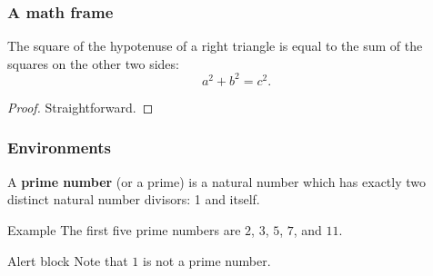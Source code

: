 \documentclass[pdflatex,compress,aspectratio=169]{beamer}
\begin{document}
\begin{frame}
\frametitle{A math frame}

\begin{theorem}[Pythagoras]
The square of the hypotenuse of a \alert{right} triangle is equal to the sum of the squares on the other two sides:
\[
a^2 + b^2 = c^2.
\]
\end{theorem}

\begin{proof}
Straightforward.
\end{proof}

\end{frame}


\begin{frame}
\frametitle{Environments}

\begin{definition}
A \textbf{prime number} (or a prime) is a natural number which has exactly two distinct natural number divisors: 1 and itself.
\end{definition}

\begin{exampleblock}{Example}
The first five prime numbers are $2$, $3$, $5$, $7$, and $11$.
\end{exampleblock}

\begin{alertblock}{Alert block}
Note that $1$ is not a prime number.
\end{alertblock}

\end{frame}
\end{document}
